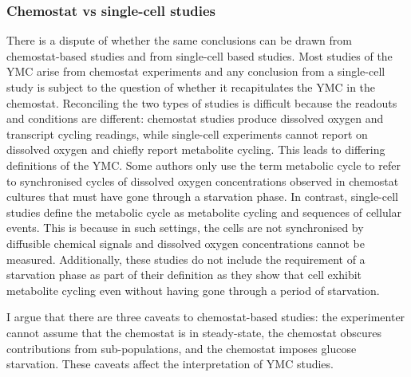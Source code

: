 
\subsubsection{Chemostat vs single-cell studies}
\label{subsubsec:intro-ymc-unresolved-chemostat_singlecell}

There is a dispute of whether the same conclusions can be drawn from chemostat-based studies and from single-cell based studies.
Most studies of the YMC arise from chemostat experiments and any conclusion from a single-cell study is subject to the question of whether it recapitulates the YMC in the chemostat.
Reconciling the two types of studies is difficult because the readouts and conditions are different:
chemostat studies produce dissolved oxygen and transcript cycling readings, while single-cell experiments cannot report on dissolved oxygen and chiefly report metabolite cycling.
This leads to differing definitions of the YMC.
Some authors \parencite{laxmanBehaviorMetabolicCycling2010, caustonMetabolicRhythmsFramework2018} only use the term metabolic cycle to refer to synchronised cycles of dissolved oxygen concentrations observed in chemostat cultures that must have gone through a starvation phase.
In contrast, single-cell studies \parencite{baumgartnerFlavinbasedMetabolicCycles2018, zylstraMetabolicDynamicsCell2022} define the metabolic cycle as metabolite cycling and sequences of cellular events.
This is because in such settings, the cells are not synchronised by diffusible chemical signals and dissolved oxygen concentrations cannot be measured.
Additionally, these studies do not include the requirement of a starvation phase as part of their definition as they show that cell exhibit metabolite cycling even without having gone through a period of starvation.

I argue that there are three caveats to chemostat-based studies:
the experimenter cannot assume that the chemostat is in steady-state,
the chemostat obscures contributions from sub-populations,
and the chemostat imposes glucose starvation.
These caveats affect the interpretation of YMC studies.

